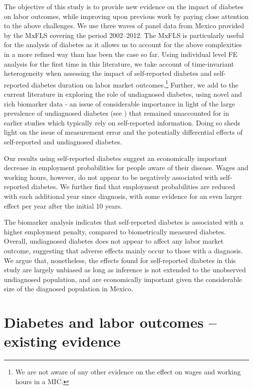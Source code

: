 \documentclass[12pt,english]{article}
\begin{document}
The objective of this study is to provide new evidence on the impact of diabetes on labor outcomes, while improving upon previous work by paying close attention to the above challenges. We use three waves of panel data from Mexico provided by the \ac{MxFLS} covering the period 2002--2012. The \ac{MxFLS} is particularly useful for the analysis of diabetes as it allows us to account for the above complexities in a more refined way than has been the case so far. Using individual level \ac{FE} analysis for the first time in this literature, we take account of time-invariant heterogeneity when assessing the impact of self-reported diabetes and self-reported diabetes duration on labor market outcomes.\footnote{We are not aware of any other evidence on the effect on wages and working hours in a \ac{MIC}.} Further, we add to the current literature in exploring the role of undiagnosed diabetes, using novel and rich biomarker data - an issue of considerable importance in light of the large prevalence of undiagnosed diabetes (see \textcite{Beagley2014}) that remained unaccounted for in earlier studies which typically rely on self-reported information. Doing so sheds light on the issue of measurement error and the potentially differential effects of self-reported and undiagnosed diabetes. 

Our  results using self-reported diabetes suggest an economically important decrease in employment probabilities for people aware of their disease. Wages and working hours, however, do not appear to be negatively associated with self-reported diabetes. We further find that employment probabilities are reduced with each additional year since diagnosis, with some evidence for an even larger effect per year after the initial 10 years. 

The biomarker analysis indicates that self-reported diabetes is associated with a higher employment penalty, compared to biometrically measured diabetes. Overall, undiagnosed diabetes does not appear to affect any labor market outcome, suggesting that adverse effects mainly occur to those with a diagnosis. We argue that, nonetheless, the effects found for self-reported diabetes in this study are largely unbiased as long as inference is not extended to the unobserved undiagnosed population, and are economically important given the considerable size of the diagnosed population in Mexico.


\section{\label{sec:Labor  outcomes and diabetes literature} Diabetes and labor outcomes -- existing evidence }
\end{document}
